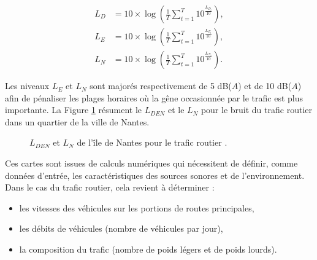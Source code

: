 \begin{subequations}
\begin{align}
L_D &= 10\times\log\left(\frac{1}{T} \sum_{t = 1}^{T}10^{\frac{L_{D_t}}{10}}\right),\\
L_E &= 10\times\log\left(\frac{1}{T} \sum_{t = 1}^{T}10^{\frac{L_{E_t}}{10}}\right),\\
L_N &= 10\times\log\left(\frac{1}{T} \sum_{t = 1}^{T}10^{\frac{L_{N_t}}{10}}\right).
\end{align}
\end{subequations}

Les niveaux $L_E$ et $L_N$ sont majorés respectivement de 5 dB($A$) et de 10 dB($A$) afin de pénaliser les plages horaires où la gêne occasionnée par le trafic est plus importante. La Figure \ref{fig:carto_nantes} résument le $L_{DEN}$ et le $L_N$ pour le bruit du trafic routier dans un quartier de la ville de Nantes.

\begin{figure}[t]
\centering
{}
\caption{$L_{DEN}$  et $L_N$  de l'île de Nantes pour le trafic routier \cite{nantes_carte}.}
\label{fig:carto_nantes}
\end{figure}

Ces cartes sont issues de calculs numériques qui nécessitent de définir, comme données d'entrée, les caractéristiques des sources sonores et de l'environnement.  Dans le cas du trafic routier, cela revient à déterminer : 

\begin{itemize}
\item les vitesses des véhicules sur les portions de routes principales, 
\item les débits de véhicules (nombre de véhicules par jour), \item la composition du trafic (nombre de poids légers et de poids lourds).\\
\end{itemize}

